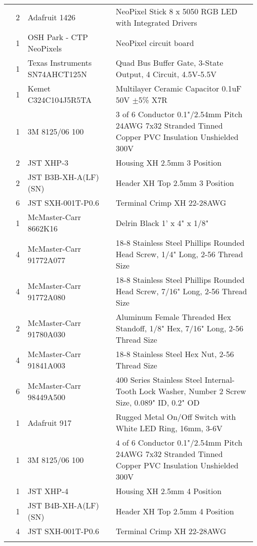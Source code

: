 \begin{longtabu}{X[3,c,m] X[1,c,m] X[3,c,m] X[5,l,m]}
   & 2 & Adafruit 1426 & NeoPixel Stick 8 x 5050 RGB LED with Integrated Drivers \\
  & 1 & OSH Park - CTP NeoPixels & NeoPixel circuit board \\
  & 1 & Texas Instruments SN74AHCT125N & Quad Bus Buffer Gate, 3-State Output, 4 Circuit, 4.5V-5.5V \\
  & 1 & Kemet C324C104J5R5TA & Multilayer Ceramic Capacitor 0.1uF 50V $\pm$5\% X7R \\
  & 1 & 3M 8125/06 100 & 3 of 6 Conductor 0.1"/2.54mm Pitch 24AWG 7x32 Stranded Tinned Copper PVC Insulation Unshielded 300V \\
  & 2 & JST XHP-3 & Housing XH 2.5mm 3 Position \\
  & 2 & JST B3B-XH-A(LF)(SN) & Header XH Top 2.5mm 3 Position \\
  & 6 & JST SXH-001T-P0.6 & Terminal Crimp XH 22-28AWG \\
  & 1 & McMaster-Carr 8662K16 & Delrin Black 1' x 4" x 1/8" \\
  & 4 & McMaster-Carr 91772A077 & 18-8 Stainless Steel Phillips Rounded Head Screw, 1/4" Long, 2-56 Thread Size \\
  & 4 & McMaster-Carr 91772A080 & 18-8 Stainless Steel Phillips Rounded Head Screw, 7/16" Long, 2-56 Thread Size \\
  & 2 & McMaster-Carr 91780A030 & Aluminum Female Threaded Hex Standoff, 1/8" Hex, 7/16" Long, 2-56 Thread Size \\
  & 4 & McMaster-Carr 91841A003 & 18-8 Stainless Steel Hex Nut, 2-56 Thread Size \\
  & 6 & McMaster-Carr 98449A500 & 400 Series Stainless Steel Internal-Tooth Lock Washer, Number 2 Screw Size, 0.089" ID, 0.2" OD \\ \mrule

   & 1 & Adafruit 917 & Rugged Metal On/Off Switch with White LED Ring, 16mm, 3-6V \\
  & 1 & 3M 8125/06 100 & 4 of 6 Conductor 0.1"/2.54mm Pitch 24AWG 7x32 Stranded Tinned Copper PVC Insulation Unshielded 300V \\
  & 1 & JST XHP-4 & Housing XH 2.5mm 4 Position \\
  & 1 & JST B4B-XH-A(LF)(SN) & Header XH Top 2.5mm 4 Position \\
  & 4 & JST SXH-001T-P0.6 & Terminal Crimp XH 22-28AWG \\ \mrule


\end{longtabu}
